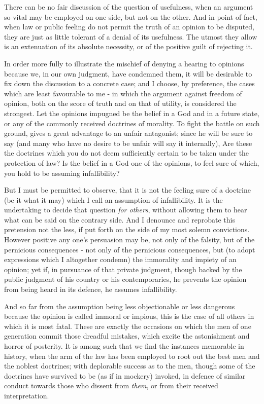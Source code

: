 There can be no fair discussion of the question of usefulness, when an argument so vital may be employed on one side, but not on the other. And in point of fact, when law or public feeling do not permit the truth of an opinion to be disputed, they are just as little tolerant of a denial of its usefulness. The utmost they allow is an extenuation of its absolute necessity, or of the positive guilt of rejecting it.\par

In order more fully to illustrate the mischief of denying a hearing to opinions because we, in our own judgment, have condemned them, it will be desirable to fix down the discussion to a concrete case; and I choose, by preference, the cases which are least favourable to me - in which the argument against freedom of opinion, both on the score of truth and on that of utility, is considered the strongest. Let the opinions impugned be the belief in a God and in a future state, or any of the commonly received doctrines of morality. To fight the battle on such ground, gives a great advantage to an unfair antagonist; since he will be sure to say (and many who have no desire to be unfair will say it internally), Are these the doctrines which you do not deem sufficiently certain to be taken under the protection of law? Is the belief in a God one of the opinions, to feel sure of which, you hold to be assuming infallibility?\par

But I must be permitted to observe, that it is not the feeling sure of a doctrine (be it what it may) which I call an assumption of infallibility. It is the undertaking to decide that question \textit{for others}, without allowing them to hear what can be said on the contrary side. And I denounce and reprobate this pretension not the less, if put forth on the side of my most solemn convictions. However positive any one’s persuasion may be, not only of the falsity, but of the pernicious consequences - not only of the pernicious consequences, but (to adopt expressions which I altogether condemn) the immorality and impiety of an opinion; yet if, in pursuance of that private judgment, though backed by the public judgment of his country or his contemporaries, he prevents the opinion from being heard in its defence, he assumes infallibility.\par

And so far from the assumption being less objectionable or less dangerous because the opinion is called immoral or impious, this is the case of all others in which it is most fatal. These are exactly the occasions on which the men of one generation commit those dreadful mistakes, which excite the astonishment and horror of posterity. It is among such that we find the instances memorable in history, when the arm of the law has been employed to root out the best men and the noblest doctrines; with deplorable success as to the men, though some of the doctrines have survived to be (as if in mockery) invoked, in defence of similar conduct towards those who dissent from \textit{them}, or from their received interpretation.\par

